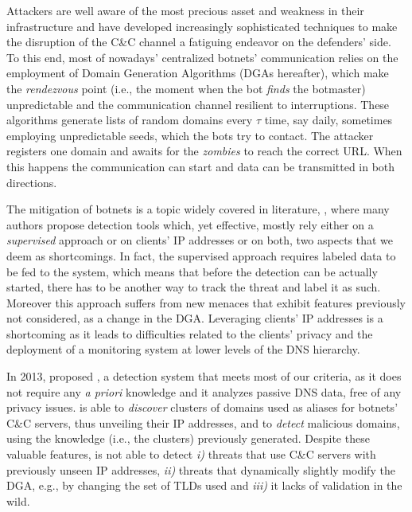Attackers are well aware of the most precious asset and weakness in their
infrastructure and have developed increasingly sophisticated techniques to make
the disruption of the C\&C channel a fatiguing endeavor on the defenders' side. To this end, most of nowadays' centralized
botnets' communication relies on the employment of Domain Generation Algorithms
(DGAs hereafter), which make the \emph{rendezvous} point (i.e., the moment when the bot \emph{finds} the botmaster) unpredictable and the communication channel resilient to interruptions. These algorithms generate lists of random domains every $\tau$ time, say daily, sometimes employing unpredictable seeds, which the
bots try to contact. The attacker registers one domain and
awaits for the \emph{zombies} to reach the correct URL. When this happens the
communication can start and data can be transmitted in both directions.

The mitigation of botnets is a topic widely covered in literature, \cite{antonakakis2011} \cite{bailey2009} \cite{bilge2012}  \cite{neugschwandtner2011}
\cite{schiavoni2013} \cite{sharifnya2013} \cite{gross2009}, where many
authors
propose detection tools which, yet effective, mostly rely either on a \emph{
supervised} approach or on clients' IP addresses or on both, two aspects that
we deem as shortcomings. In fact, the supervised approach requires labeled data to
be fed to the system, which means that before the detection can be actually
started, there has to be another way to track the threat and label it as such. Moreover this approach
suffers from new menaces that exhibit features previously not considered, as a
change in the DGA.
Leveraging clients' IP addresses is a shortcoming as it leads to difficulties
related to the clients' privacy and the deployment of a monitoring system at lower
levels of the DNS hierarchy.

In 2013, \citet{schiavoni2013} proposed \phoenix, a detection system that meets
most of our criteria, as it does not require any \emph{a priori} knowledge and it
analyzes passive
DNS data, free of any privacy issues. \phoenix is able to \emph{discover}
clusters of domains used as aliases for botnets' C\&C servers, thus unveiling
their IP addresses, and to \emph{detect} malicious domains, using the knowledge
(i.e., the clusters) previously generated. Despite these valuable features,
\phoenix is not able to detect \emph{i)} threats that use C\&C servers with
previously unseen IP addresses, \emph{ii)} threats that dynamically slightly modify the
DGA, e.g., by changing the set of TLDs used and \emph{iii)} it lacks
of validation in the wild.

